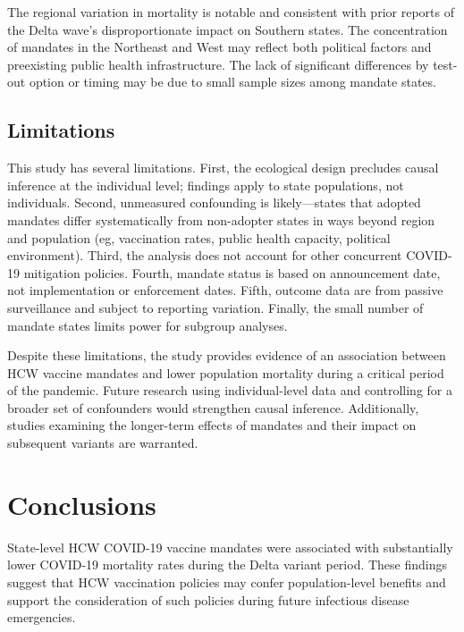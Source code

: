 \documentclass[10pt, letterpaper]{article}
\begin{document}
The regional variation in mortality is notable and consistent with prior reports of the Delta wave's disproportionate impact on Southern states.\cite{CDC2022} The concentration of mandates in the Northeast and West may reflect both political factors and preexisting public health infrastructure. The lack of significant differences by test-out option or timing may be due to small sample sizes among mandate states.

\subsection*{Limitations}
This study has several limitations. First, the ecological design precludes causal inference at the individual level; findings apply to state populations, not individuals. Second, unmeasured confounding is likely---states that adopted mandates differ systematically from non-adopter states in ways beyond region and population (eg, vaccination rates, public health capacity, political environment). Third, the analysis does not account for other concurrent COVID-19 mitigation policies. Fourth, mandate status is based on announcement date, not implementation or enforcement dates. Fifth, outcome data are from passive surveillance and subject to reporting variation. Finally, the small number of mandate states limits power for subgroup analyses.

Despite these limitations, the study provides evidence of an association between HCW vaccine mandates and lower population mortality during a critical period of the pandemic. Future research using individual-level data and controlling for a broader set of confounders would strengthen causal inference. Additionally, studies examining the longer-term effects of mandates and their impact on subsequent variants are warranted.


\section*{Conclusions}

State-level HCW COVID-19 vaccine mandates were associated with substantially lower COVID-19 mortality rates during the Delta variant period. These findings suggest that HCW vaccination policies may confer population-level benefits and support the consideration of such policies during future infectious disease emergencies.
\end{document}
